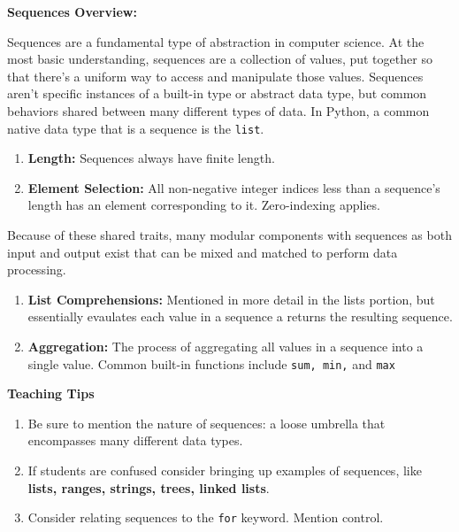 \textbf{Sequences Overview:}

Sequences are a fundamental type of abstraction in computer science.
At the most basic understanding, sequences are a collection of values, put together so that there's a uniform way to access and manipulate those values.
Sequences aren't specific instances of a built-in type or abstract data type, but common behaviors shared between many different types of data.
In Python, a common native data type that is a sequence is the \lstinline{list}.
\begin{enumerate}
	\item \textbf{Length: } Sequences always have finite length.
	\item \textbf{Element Selection: } All non-negative integer indices less than a sequence's length has an element corresponding to it. Zero-indexing applies.
\end{enumerate}

Because of these shared traits, many modular components with sequences as both input and output exist that can be mixed and matched to perform data processing.
\begin{enumerate}
    \item \textbf{List Comprehensions: } Mentioned in more detail in the lists portion, but essentially evaulates each value in a sequence a returns the resulting sequence.
    \item \textbf{Aggregation: } The process of aggregating all values in a sequence into a single value. Common built-in functions include \lstinline{sum, min,} and \lstinline{max}
\end{enumerate}
\begin{blocksection}
	\begin{guide}
	\textbf{Teaching Tips}
	\begin{enumerate}
		\item Be sure to mention the nature of sequences: a loose umbrella that encompasses many different data types.
		\item If students are confused consider bringing up examples of sequences, like \textbf{lists, ranges, strings, trees, linked lists}.
		\item Consider relating sequences to the \lstinline{for} keyword. Mention control.
	\end{enumerate}
	\end{guide}
\end{blocksection}
